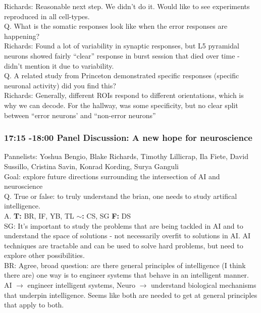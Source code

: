 \documentclass[12pt]{article}
\begin{document}
Richards: Reasonable next step. We didn't do it. Would like to see experiments reproduced in all cell-types. \\

Q. What is the somatic responses look like when the error responses are happening? \\

Richards: Found a lot of variability in synaptic responses, but L5 pyramidal neurons showed fairly ``clear'' response in burst session that died over time - didn't mention it due to variability. \\

Q. A related study from Princeton demonstrated specific responses (specific neuronal activity) did you find this? \\

Richards: Generally, different ROIs respond to different orientations, which is why we can decode. For the hallway, was some specificity, but no clear split between ``error neurons' and ``non-error neurons'' \\


\subsubsection{17:15 -18:00 Panel Discussion: A new hope for neuroscience}

Pannelists: Yoshua Bengio, Blake Richards, Timothy Lillicrap,  Ila Fiete, David Sussillo, Cristina Savin, Konrad Kording, Surya Ganguli \\

Goal: explore future directions surrounding the intersection of AI and neuroscience \\

Q. True or false: to truly understand the brian, one needs to study artifical intelligence.  \\

A. \textbf{T: } BR, IF, YB, TL $\mathbf{\sim}$\textbf{:} CS, SG \textbf{F: }DS \\

SG: It's important to study the problems that are being tackled in AI and to understand the space of solutions - not necessarily overfit to solutions in AI. AI techniques are tractable and can be used to solve hard problems, but need to explore other possibilities. \\

BR: Agree, broad question: are there general principles of intelligence (I think there are) one way is to engineer systems that behave in an intelligent manner. AI $\rightarrow$ engineer intelligent systems, Neuro $\rightarrow$ understand biological mechanisms that underpin intelligence. Seems like both are needed to get at general principles that apply to both. \\
\end{document}

